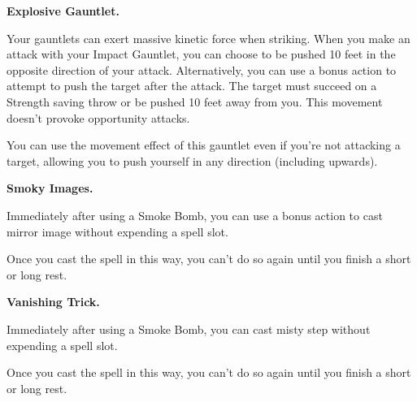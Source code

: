 \documentclass[11pt,twoside,openany]{book}  %
\begin{document}
\begin{fiveitemize}

	\item \textbf{Explosive Gauntlet.}
	
	Your gauntlets can exert massive kinetic force when striking. When you make an attack with your Impact Gauntlet, you can choose to be pushed 10 feet in the opposite direction of your attack. Alternatively, you can use a bonus action to attempt to push the target after the attack. The target must succeed on a Strength saving throw or be pushed 10 feet away from you. This movement doesn’t provoke opportunity attacks.

	You can use the movement effect of this gauntlet even if you’re not attacking a target, allowing you to push yourself in any direction (including upwards).

	\item \textbf{Smoky Images.}
	
	Immediately after using a Smoke Bomb, you can use a bonus action to cast mirror image without expending a spell slot.

	Once you cast the spell in this way, you can’t do so again until you finish a short or long rest.

	\item \textbf{Vanishing Trick.}
	
	Immediately after using a Smoke Bomb, you can cast misty step without expending a spell slot.

	Once you cast the spell in this way, you can’t do so again until you finish a short or long rest.
\end{fiveitemize}
\end{document}
